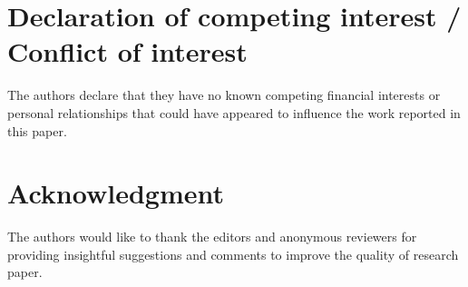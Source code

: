 \documentclass[a4paper,fleqn]{cas-dc}
\begin{document}
\lipsum[4]

\section*{Declaration of competing interest / Conflict of interest}
The authors declare that they have no known competing financial
interests or personal relationships that could have appeared
to influence the work reported in this paper.

\section*{Acknowledgment}
The authors would like to thank the editors and anonymous
reviewers for providing insightful suggestions and comments
to improve the quality of research paper.

\printcredits

%
%
 				


\vskip6pt
\end{document}
